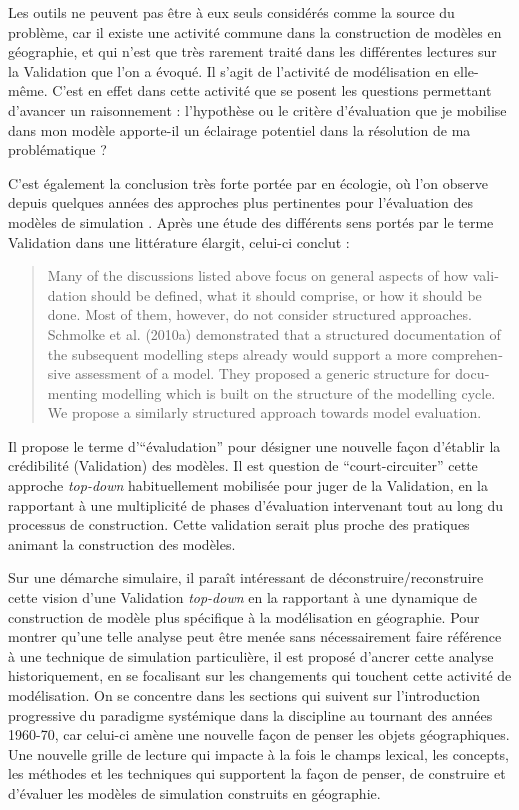 Les outils ne peuvent pas être à eux seuls considérés comme la source du problème, car il existe une activité commune dans la construction de modèles en géographie, et qui n'est que très rarement traité dans les différentes lectures sur la Validation que l'on a évoqué. Il s'agit de l'activité de modélisation en elle-même. C'est en effet dans cette activité que se posent les questions permettant d'avancer un raisonnement : l'hypothèse ou le critère d'évaluation que je mobilise dans mon modèle apporte-il un éclairage potentiel dans la résolution de ma problématique ?


C'est également la conclusion très forte portée par \textcite{Augusiak2014} en écologie, où l'on observe depuis quelques années des approches plus pertinentes pour l'évaluation des modèles de simulation \autocites{Grimm2005,Grimm2010}. Après une étude des différents sens portés par le terme Validation dans une littérature élargit, celui-ci conclut : \foreignblockquote{english}[{\cite[120]{Augusiak2014}}]{Many of the discussions listed above focus on general aspects of how validation should be defined, what it should comprise, or how it should be done. Most of them, however, do not consider structured approaches. Schmolke et al. (2010a) demonstrated that a structured documentation of the subsequent modelling steps already would support a more comprehensive assessment of a model. They proposed a generic structure for documenting modelling which is built on the structure of the modelling cycle. We propose a similarly structured approach towards model evaluation.}

Il propose le terme d'\enquote{évaludation} pour désigner une nouvelle façon d'établir la crédibilité (Validation) des modèles. Il est question de \enquote{court-circuiter} cette approche \textit{top-down} habituellement mobilisée pour juger de la Validation, en la rapportant à une multiplicité de phases d'évaluation intervenant tout au long du processus de construction. Cette validation serait plus proche des pratiques animant la construction des modèles.

Sur une démarche simulaire, il paraît intéressant de déconstruire/reconstruire cette vision d'une Validation \textit{top-down} en la rapportant à une dynamique de construction de modèle plus spécifique à la modélisation en géographie. Pour montrer qu'une telle analyse peut être menée sans nécessairement faire référence à une technique de simulation particulière, il est proposé d'ancrer cette analyse historiquement, en se focalisant sur les changements qui touchent cette activité de modélisation. On se concentre dans les sections qui suivent sur l'introduction progressive du paradigme systémique dans la discipline au tournant des années 1960-70, car celui-ci amène une nouvelle façon de penser les objets géographiques. Une nouvelle grille de lecture qui impacte à la fois le champs lexical, les concepts, les méthodes et les techniques qui supportent la façon de penser, de construire et d'évaluer les modèles de simulation construits en géographie.
